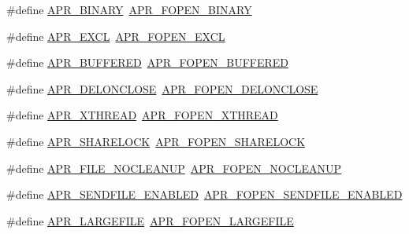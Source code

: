 \begin{DoxyCompactItemize}
\item 
\#define \hyperlink{group__apr__file__open__flags_ga0e7556bac0cc0d1dafdf38952a4e4015}{A\-P\-R\-\_\-\-B\-I\-N\-A\-R\-Y}~\hyperlink{group__apr__file__open__flags_gacb20b3028864f34cb26314fe2cacc3fa}{A\-P\-R\-\_\-\-F\-O\-P\-E\-N\-\_\-\-B\-I\-N\-A\-R\-Y}
\item 
\#define \hyperlink{group__apr__file__open__flags_ga209c26b2b903cc23417f6781d4edf891}{A\-P\-R\-\_\-\-E\-X\-C\-L}~\hyperlink{group__apr__file__open__flags_gabb7fb062cdf1d58faee8c7ea518496f1}{A\-P\-R\-\_\-\-F\-O\-P\-E\-N\-\_\-\-E\-X\-C\-L}
\item 
\#define \hyperlink{group__apr__file__open__flags_ga6edc818199e8b90e3dabf97c42a27158}{A\-P\-R\-\_\-\-B\-U\-F\-F\-E\-R\-E\-D}~\hyperlink{group__apr__file__open__flags_gac48fd4c853c9f561632a2e8aaf5d8d97}{A\-P\-R\-\_\-\-F\-O\-P\-E\-N\-\_\-\-B\-U\-F\-F\-E\-R\-E\-D}
\item 
\#define \hyperlink{group__apr__file__open__flags_gaebc7f034a72dffe64858b1b9451994ff}{A\-P\-R\-\_\-\-D\-E\-L\-O\-N\-C\-L\-O\-S\-E}~\hyperlink{group__apr__file__open__flags_ga5d3756f6d242c667ed1d3f54af4916eb}{A\-P\-R\-\_\-\-F\-O\-P\-E\-N\-\_\-\-D\-E\-L\-O\-N\-C\-L\-O\-S\-E}
\item 
\#define \hyperlink{group__apr__file__open__flags_gaa9120c0e395d8a0e640b5eafa8f11cce}{A\-P\-R\-\_\-\-X\-T\-H\-R\-E\-A\-D}~\hyperlink{group__apr__file__open__flags_ga435cd9b2604b11796779c23ffa00a3dd}{A\-P\-R\-\_\-\-F\-O\-P\-E\-N\-\_\-\-X\-T\-H\-R\-E\-A\-D}
\item 
\#define \hyperlink{group__apr__file__open__flags_ga41277154f4f754a22287ed90e9466811}{A\-P\-R\-\_\-\-S\-H\-A\-R\-E\-L\-O\-C\-K}~\hyperlink{group__apr__file__open__flags_ga426f6e2a8457ab410d99248269059a18}{A\-P\-R\-\_\-\-F\-O\-P\-E\-N\-\_\-\-S\-H\-A\-R\-E\-L\-O\-C\-K}
\item 
\#define \hyperlink{group__apr__file__open__flags_ga3ef1061dbb3adf595701bd12edb062f9}{A\-P\-R\-\_\-\-F\-I\-L\-E\-\_\-\-N\-O\-C\-L\-E\-A\-N\-U\-P}~\hyperlink{group__apr__file__open__flags_ga3fc9b5a7791d9f462997cd29de67eb80}{A\-P\-R\-\_\-\-F\-O\-P\-E\-N\-\_\-\-N\-O\-C\-L\-E\-A\-N\-U\-P}
\item 
\#define \hyperlink{group__apr__file__open__flags_ga17e216aadb23254580258889e10c53f3}{A\-P\-R\-\_\-\-S\-E\-N\-D\-F\-I\-L\-E\-\_\-\-E\-N\-A\-B\-L\-E\-D}~\hyperlink{group__apr__file__open__flags_ga60c21e28e4a612d58a874fe2cc71a6e4}{A\-P\-R\-\_\-\-F\-O\-P\-E\-N\-\_\-\-S\-E\-N\-D\-F\-I\-L\-E\-\_\-\-E\-N\-A\-B\-L\-E\-D}
\item 
\#define \hyperlink{group__apr__file__open__flags_gaafa04fd4ec71910a5d7af1c7f5596bad}{A\-P\-R\-\_\-\-L\-A\-R\-G\-E\-F\-I\-L\-E}~\hyperlink{group__apr__file__open__flags_gaf6cfaa4789e6264afd186235f0adbc22}{A\-P\-R\-\_\-\-F\-O\-P\-E\-N\-\_\-\-L\-A\-R\-G\-E\-F\-I\-L\-E}
\end{DoxyCompactItemize}


